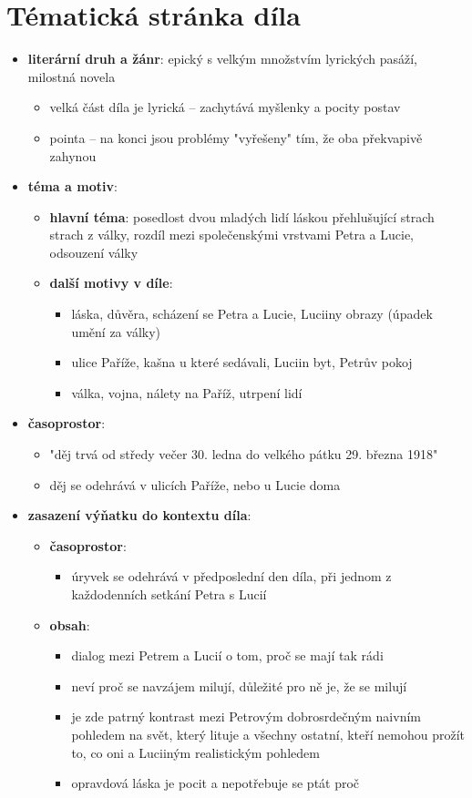 \documentclass[10pt,a4paper]{article}
\begin{document}
\newpage
\section*{Tématická stránka díla}
\begin{itemize}
\item \textbf{literární druh a žánr}: epický s velkým množstvím lyrických pasáží, milostná novela
	\begin{itemize}
	\item velká část díla je lyrická -- zachytává myšlenky a pocity postav
	\item pointa -- na konci jsou problémy "vyřešeny" tím, že oba překvapivě zahynou
	\end{itemize}
\item \textbf{téma a motiv}:
	\begin{itemize}
	\item \textbf{hlavní téma}: posedlost dvou mladých lidí láskou přehlušující strach strach z války, rozdíl mezi společenskými vrstvami Petra a Lucie, odsouzení války
	\item \textbf{další motivy v díle}:
		\begin{itemize}
		\item láska, důvěra, scházení se Petra a Lucie, Luciiny obrazy (úpadek umění za války)
		\item ulice Paříže, kašna u které sedávali, Luciin byt, Petrův pokoj
		\item válka, vojna, nálety na Paříž, utrpení lidí
		\end{itemize}
	\end{itemize}
\item \textbf{časoprostor}:
	\begin{itemize}
	\item "děj trvá od středy večer 30. ledna do velkého pátku 29. března 1918"
	\item děj se odehrává v ulicích Paříže, nebo u Lucie doma
	\end{itemize}
\item \textbf{zasazení výňatku do kontextu díla}:
	\begin{itemize}
	\item \textbf{časoprostor}:
		\begin{itemize}
		\item úryvek se odehrává v předposlední den díla, při jednom z každodenních setkání Petra s Lucií
		\end{itemize}
	\item \textbf{obsah}: 
		\begin{itemize}
		\item dialog mezi Petrem a Lucií o tom, proč se mají tak rádi
		\item neví proč se navzájem milují, důležité pro ně je, že se milují
		\item je zde patrný kontrast mezi Petrovým dobrosrdečným naivním pohledem na svět, který lituje a všechny ostatní, kteří nemohou prožít to, co oni a Luciiným realistickým pohledem
		\item opravdová láska je pocit a nepotřebuje se ptát proč
		\end{itemize}
	\end{itemize}
\end{itemize}
\end{document}
